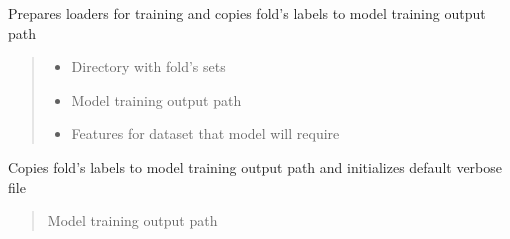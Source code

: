 \documentclass[letterpaper,10pt,english]{sphinxmanual}
\begin{document}
\begin{fulllineitems}
\begin{fulllineitems}
\end{fulllineitems}


\begin{fulllineitems}
\label{\detokenize{net:net.UVANEMO.__init_loaders}}
\pysigstartsignatures
{}
\pysigstopsignatures
\sphinxAtStartPar
Prepares loaders for training and copies fold’s labels to model training output path
\begin{quote}\begin{description}
\begin{itemize}
\item {} 
\sphinxAtStartPar
{} \textendash{} Directory with fold’s sets

\item {} 
\sphinxAtStartPar
{} \textendash{} Model training output path

\item {} 
\sphinxAtStartPar
{} \textendash{} Features for dataset that model will require

\end{itemize}

\end{description}\end{quote}

\end{fulllineitems}


\begin{fulllineitems}
\label{\detokenize{net:net.UVANEMO.__init_outputs}}
\pysigstartsignatures
{}
\pysigstopsignatures
\sphinxAtStartPar
Copies fold’s labels to model training output path and initializes default verbose file
\begin{quote}\begin{description}
\sphinxAtStartPar
{} \textendash{} Model training output path


\end{description}
\end{quote}
\end{fulllineitems}
\end{fulllineitems}
\end{document}
